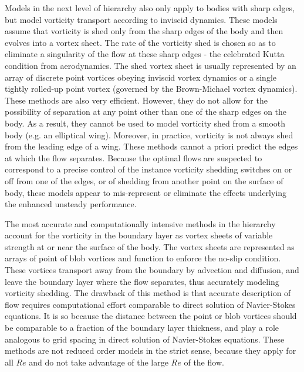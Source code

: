 Models in the next level of hierarchy also only apply to bodies with sharp edges, but model vorticity transport according to inviscid dynamics.
These models assume that vorticity is shed only from the sharp edges of the body and then evolves into a vortex sheet.
The rate of the vorticity shed is chosen so as to eliminate a singularity of the flow at these sharp edges - the celebrated Kutta condition from aerodynamics.
The shed vortex sheet is usually represented by an array of discrete point vortices obeying inviscid vortex dynamics or a single tightly rolled-up point vortex (governed by the Brown-Michael vortex dynamics).
These methods are also very efficient.
However, they do not allow for the possibility of separation at any point other than one of the sharp edges on the body.
As a result, they cannot be used to model vorticity shed from a smooth body (e.g. an elliptical wing).
Moreover, in practice, vorticity is not always shed from the leading edge of a wing.
These methods cannot a priori predict the edges at which the flow separates.
Because the optimal flows are suspected to correspond to a precise control of the instance vorticity shedding switches on or off from one of the edges, or of shedding from another point on the surface of body, these models appear to mis-represent or eliminate the effects underlying the enhanced unsteady performance.

The most accurate and computationally intensive methods in the hierarchy account for the vorticity in the boundary layer as vortex sheets of variable strength at or near the surface of the body.
The vortex sheets are represented as arrays of point of blob vortices and function to enforce the no-slip condition.
These vortices transport away from the boundary by advection and diffusion, and leave the boundary layer where the flow separates, thus accurately modeling vorticity shedding.
The drawback of this method is that accurate description of flow requires computational effort comparable to direct solution of Navier-Stokes equations.
It is so because the distance between the point or blob vortices should be comparable to a fraction of the boundary layer thickness, and play a role analogous to grid spacing in direct solution of Navier-Stokes equations.
These methods are not reduced order models in the strict sense, because they apply for all $Re$ and do not take advantage of the large $Re$ of the flow.
